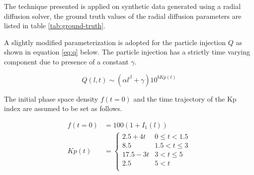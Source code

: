 \documentclass{article}
\begin{document}
The technique presented is applied on synthetic data generated using a radial diffusion solver, 
the ground truth values of the radial diffusion parameters are listed in table \ref{tab:ground-truth}.

A slightly modified parameterization is adopted for the particle injection $Q$ as shown in equation \ref{eq:q}
below. The particle injection has a strictly time varying component due to presence of a constant $\gamma$.

\begin{equation}\label{eq:q}
Q(l,t)  \sim (\alpha l^{\beta} + \gamma) 10^{b Kp(t)}
\end{equation}

The initial phase space density $f(t = 0)$ and the time trajectory 
of the Kp index are assumed to be set as follows.

\begin{align}
f(t = 0) &= 100(1 + I_1(l)) \\
Kp(t) &= \left\{\begin{matrix}
2.5 + 4t & 0 \leq t < 1.5\\ 
8.5 & 1.5 < t \leq 3\\ 
17.5-3t & 3 <  t \leq 5 \\ 
2.5 & 5 < t\\ 
\end{matrix}\right.
\end{align}
\end{document}
